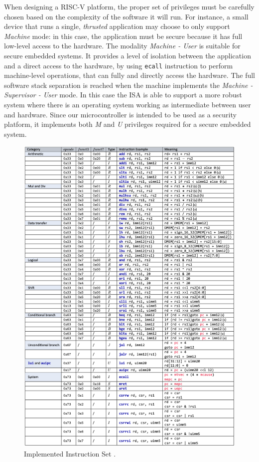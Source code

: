 When designing a RISC-V platform, the proper set of privileges must be carefully chosen based on the complexity of the software it will run. For instance, a small device that runs a single, \emph{thrusted} application may choose to only support \emph{Machine} mode: in this case, the application must be secure because it has full low-level access to the hardware. The modality \emph{Machine - User} is suitable for secure embedded systems. It provides a level of isolation between the application and a direct access to the hardware, by using \texttt{ecall} instruction to perform machine-level operations, that can fully and directly access the hardware. The full software stack separation is reached when the machine implements the \emph{Machine - Supervisor - User} mode. In this case the ISA is able to support a more robust system where there is an operating system working as intermediate between user and hardware.\vspace{5mm} \newline
Since our microcontroller is intended to be used as a security platform, it implements both \emph{M} and \emph{U} privileges required for a secure embedded system.
\begin{figure}[h!]
\includegraphics[scale=0.7]{./images/mc2101isa}
\caption{Implemented Instruction Set \cite{aftabManual}.}
\label{fig:mc2101i} %
\end{figure}

